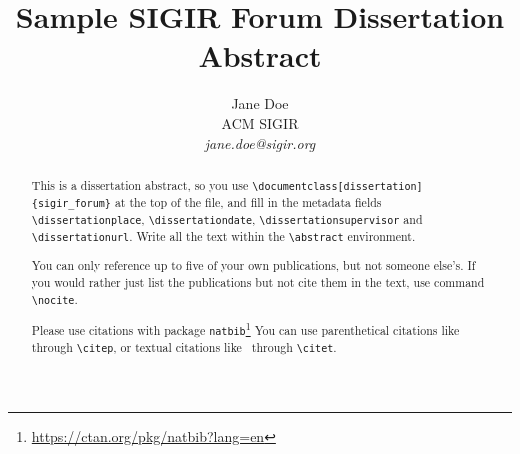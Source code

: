 \documentclass[dissertation]{sigir_forum}
\begin{document}
\title{Sample SIGIR Forum Dissertation Abstract}

\author{
Jane Doe\\ACM SIGIR\\\emph{jane.doe@sigir.org}
}

\maketitle 
\begin{abstract}
This is a dissertation abstract, so you use \texttt{\textbackslash documentclass[dissertation]\{sigir\_forum\}} at the top of the file, and fill in the metadata fields \texttt{\textbackslash dissertationplace}, \texttt{\textbackslash dissertationdate}, \texttt{\textbackslash dissertationsupervisor} and \texttt{\textbackslash dissertationurl}. Write all the text within the \texttt{\textbackslash abstract} environment.

You can only reference up to five of your own publications, but not someone else's. If you would rather just list the publications but not cite them in the text, use command \texttt{\textbackslash nocite}.

Please use citations with package \texttt{natbib}\footnote{\url{https://ctan.org/pkg/natbib?lang=en}}
You can use parenthetical citations like~\citep{forum} through \texttt{\textbackslash citep}, or textual citations like~\citet{forum} through \texttt{\textbackslash citet}.
\end{abstract}


\end{document}

